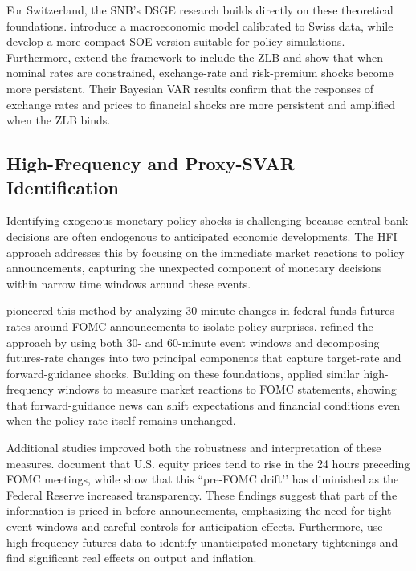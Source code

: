 \documentclass[12pt,a4paper]{article}
\begin{document}
For Switzerland, the SNB’s DSGE research builds directly on these theoretical foundations. \citet{cuchecurti2009} introduce a macroeconomic model calibrated to Swiss data, while \citet{rudolf2014} develop a more compact SOE version suitable for policy simulations. Furthermore, \citet{baurle2014} extend the framework to include the ZLB and show that when nominal rates are constrained, exchange-rate and risk-premium shocks become more persistent. Their Bayesian VAR results confirm that the responses of exchange rates and prices to financial shocks are more persistent and amplified when the ZLB binds.

\subsection{High-Frequency and Proxy-SVAR Identification}

Identifying exogenous monetary policy shocks is challenging because central-bank decisions are often endogenous to anticipated economic developments.
The HFI approach addresses this by focusing on the immediate market reactions to policy announcements, capturing the unexpected component of monetary decisions within narrow time windows around these events.

\citet{kuttner2001} pioneered this method by analyzing 30-minute changes in federal-funds-futures rates around FOMC announcements to isolate policy surprises.
\citet{gurkaynak2005} refined the approach by using both 30- and 60-minute event windows and decomposing futures-rate changes into two principal components that capture target-rate and forward-guidance shocks.
Building on these foundations, \citet{campbell2012} applied similar high-frequency windows to measure market reactions to FOMC statements, showing that forward-guidance news can shift expectations and financial conditions even when the policy rate itself remains unchanged.

Additional studies improved both the robustness and interpretation of these measures.
\citet{lucca2015} document that U.S. equity prices tend to rise in the 24 hours preceding FOMC meetings, while \citet{kurov2021} show that this “pre-FOMC drift’’ has diminished as the Federal Reserve increased transparency.
These findings suggest that part of the information is priced in before announcements, emphasizing the need for tight event windows and careful controls for anticipation effects.
Furthermore, \citet{nakamura2018} use high-frequency futures data to identify unanticipated monetary tightenings and find significant real effects on output and inflation.
\end{document}
